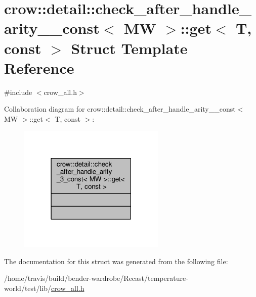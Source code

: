\hypertarget{structcrow_1_1detail_1_1check__after__handle__arity__3__const_1_1get}{\section{crow\-:\-:detail\-:\-:check\-\_\-after\-\_\-handle\-\_\-arity\-\_\-\_\-const$<$ M\-W $>$\-:\-:get$<$ T, const $>$ Struct Template Reference}
\label{structcrow_1_1detail_1_1check__after__handle__arity__3__const_1_1get}
}


{\ttfamily \#include $<$crow\-\_\-all.\-h$>$}



Collaboration diagram for crow\-:\-:detail\-:\-:check\-\_\-after\-\_\-handle\-\_\-arity\-\_\-\_\-const$<$ M\-W $>$\-:\-:get$<$ T, const $>$\-:
\nopagebreak
\begin{figure}[H]
\begin{center}
\leavevmode
\includegraphics[width=198pt]{structcrow_1_1detail_1_1check__after__handle__arity__3__const_1_1get__coll__graph}
\end{center}
\end{figure}


The documentation for this struct was generated from the following file\-:\begin{DoxyCompactItemize}
\item 
/home/travis/build/bender-\/wardrobe/\-Recast/temperature-\/world/test/lib/\hyperlink{crow__all_8h}{crow\-\_\-all.\-h}\end{DoxyCompactItemize}
